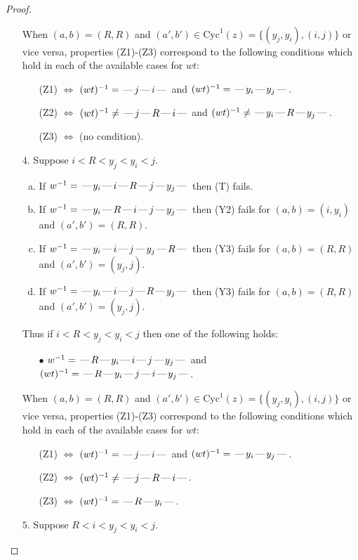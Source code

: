 \documentclass[10pt]{article}
\theoremstyle{definition}
\theoremstyle{definition}
\def\dash{\text{\hspace{0.5mm}---\hspace{0.5mm}}}
\def\Cyc{\mathrm{Cyc}}
\begin{document}
\begin{proof}
\begin{enumerate}
When $(a,b)= (R,R)$ and $(a',b')\in \Cyc^1(z)=\{(y_j,y_i),(i,j)\}$ or vice versa,
properties (Z1)-(Z3) correspond to the following conditions which
hold in each of the available cases for $wt$:
\begin{enumerate}
\item[](Z1) $\Leftrightarrow$ $(wt)^{-1} = \dash j \dash i \dash$  and $(wt)^{-1} = \dash y_i \dash y_j \dash$.
\item[](Z2) $\Leftrightarrow$ $(wt)^{-1} \neq \dash j \dash R \dash i \dash$  and $(wt)^{-1} \neq \dash y_i \dash R \dash y_j \dash$.
\item[](Z3) $\Leftrightarrow$ (no condition).
\end{enumerate}
\item[$4$.] Suppose $i < R < y_j < y_i < j$.
\begin{enumerate}[(a)]
\item If $w^{-1} = \dash y_i\dash i\dash R\dash j\dash y_j\dash $ then (T) fails.
\item If $w^{-1} = \dash y_i\dash R\dash i\dash j\dash y_j\dash $ then (Y2) fails for $(a,b)=(i,y_i)$ and $(a',b')=(R,R)$.
\item If $w^{-1} = \dash y_i\dash i\dash j\dash y_j\dash R\dash $ then (Y3) fails for $(a,b)=(R,R)$ and $(a',b')=(y_j,j)$.
\item If $w^{-1} = \dash y_i\dash i\dash j\dash R\dash y_j\dash $ then (Y3) fails for $(a,b)=(R,R)$ and $(a',b')=(y_j,j)$.
\end{enumerate}
Thus if $i < R < y_j < y_i < j$ then one of the following holds:
\begin{enumerate}
\item[$\bullet$] $w^{-1} = \dash R\dash y_i\dash i\dash j\dash y_j\dash $ and $(wt)^{-1} = \dash R\dash y_i\dash j\dash i\dash y_j\dash $.
\end{enumerate}
When $(a,b)= (R,R)$ and $(a',b')\in \Cyc^1(z)=\{(y_j,y_i),(i,j)\}$ or vice versa,
properties (Z1)-(Z3) correspond to the following conditions which
hold in each of the available cases for $wt$:
\begin{enumerate}
\item[](Z1) $\Leftrightarrow$ $(wt)^{-1} = \dash j \dash i \dash$  and $(wt)^{-1} = \dash y_i \dash y_j \dash$.
\item[](Z2) $\Leftrightarrow$ $(wt)^{-1} \neq \dash j \dash R \dash i \dash$.
\item[](Z3) $\Leftrightarrow$ $(wt)^{-1} = \dash R \dash y_i \dash$.
\end{enumerate}
\item[$5$.] Suppose $R < i < y_j < y_i < j$.

\end{enumerate}
\end{proof}
\end{document}
